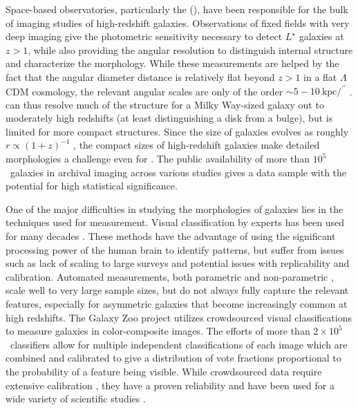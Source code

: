 \documentclass[twocolumn]{aastex6}
\begin{document}
Space-based observatories, particularly the \hubble{} (\hst), have been
responsible for the bulk of imaging studies of high-redshift galaxies.
Observations of fixed fields with very deep imaging
\citep[eg,][]{wil96,gia04,bec06,dav07,sco07,gro11} give the photometric
sensitivity necessary to detect $L^\star$ galaxies at $z>1$, while also
providing the angular resolution to distinguish internal structure and
characterize the morphology. While these measurements are helped by the fact
that the angular diameter distance is relatively flat beyond $z>1$ in a flat
$\Lambda$CDM cosmology, the relevant angular scales are only of the order
$\sim5-10~\mathrm{kpc}/^{\prime\prime}$ \citep{wri06}. \hst{} can thus resolve
much of the structure for a Milky Way-sized galaxy out to moderately high
redshifts (at least distinguishing a disk from a bulge), but is limited for
more compact structures. Since the size of galaxies evolves as roughly
$r\propto(1+z)^{-1}$ \citep{mao98,law12a}, the compact sizes of high-redshift
galaxies make detailed morphologies a challenge even for \hst{} \citep{che12}.
The public availability of more than $10^5$~galaxies in archival imaging across
various studies gives a data sample with the potential for high statistical
significance.

One of the major difficulties in studying the morphologies of galaxies lies in
the techniques used for measurement. Visual classification by experts has been
used for many decades \citep[eg,][]{hub26,dev59,san61,van76,nai10,bai11,kar15}.
These methods have the advantage of using the significant processing power of
the human brain to identify patterns, but suffer from issues such as lack of
scaling to large surveys and potential issues with replicability and
calibration. Automated measurements, both parametric \citep{pen02a,sim11,lac12}
and non-parametric \citep{abr03,con03,lot04,sca07,bam08,fre13}, scale well to
very large sample sizes, but do not always fully capture the relevant features,
especially for asymmetric galaxies that become increasingly common at high
redshifts. The Galaxy Zoo project \citep{lin08} utilizes crowdsourced visual
classifications to measure galaxies in color-composite images. The efforts of
more than $2\times10^5$~classifiers allow for multiple independent
classifications of each image which are combined and calibrated to give a
distribution of vote fractions proportional to the probability of a feature
being visible. While crowdsourced data require extensive calibration
\citep{bam09,wil13}, they have a proven reliability and have been used for a
wide variety of scientific studies
\citep[eg,][]{lan08,bam09,dar10,mas11c,ski12,sim13,sch14,wil15}. 
\end{document}

